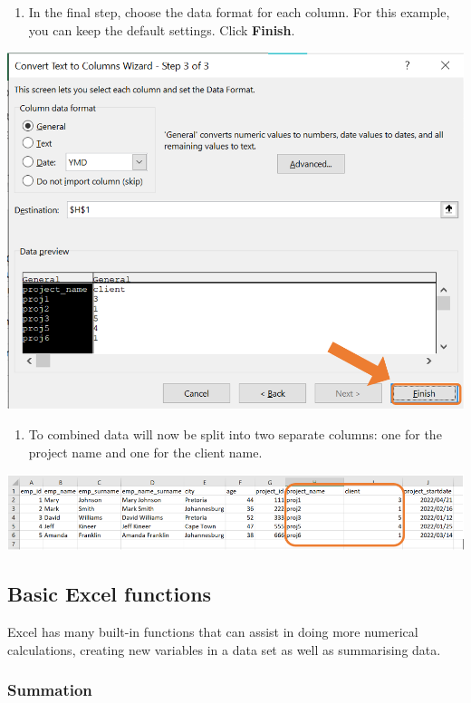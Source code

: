 \documentclass[
]{book}
\providecommand{\tightlist}{%
  \setlength{\itemsep}{0pt}\setlength{\parskip}{0pt}}
\begin{document}
\begin{enumerate}
\def\labelenumi{\arabic{enumi}.}
\setcounter{enumi}{3}
\tightlist
\item
  In the final step, choose the data format for each column. For this example, you can keep the default settings. Click \textbf{Finish}.
\end{enumerate}

\begin{center}\includegraphics[width=0.6\linewidth]{Figures/split_4} \end{center}

\begin{enumerate}
\def\labelenumi{\arabic{enumi}.}
\setcounter{enumi}{4}
\tightlist
\item
  To combined data will now be split into two separate columns: one for the project name and one for the client name.
\end{enumerate}

\begin{center}\includegraphics[width=0.8\linewidth]{Figures/split_5} \end{center}

\subsection{Basic Excel functions}\label{basic-excel-functions}

Excel has many built-in functions that can assist in doing more numerical calculations, creating new variables in a data set as well as summarising data.

\subsubsection*{Summation}\label{summation}
\end{document}
